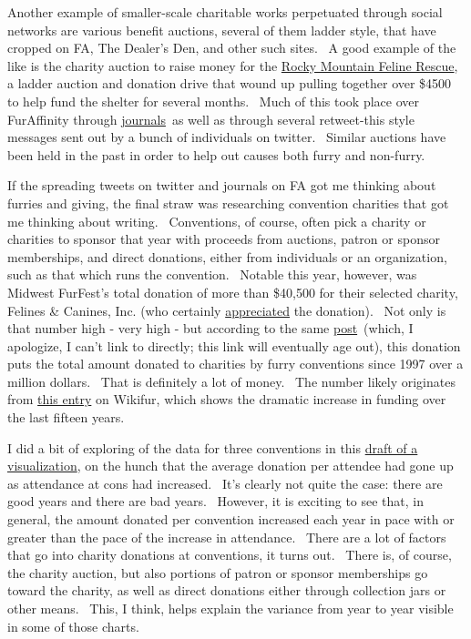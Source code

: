 Another example of smaller-scale charitable works perpetuated through
social networks are various benefit auctions, several of them ladder
style, that have cropped on FA, The Dealer's Den, and other such sites.
~A good example of the like is the charity auction to raise money for
the \href{http://www.rmfr-colorado.org/}{Rocky Mountain Feline Rescue},
a ladder auction and donation drive that wound up pulling together over
\$4500 to help fund the shelter for several months. ~Much of this took
place over FurAffinity through
\href{http://www.furaffinity.net/journal/3874623/}{journals}~as well as
through several retweet-this style messages sent out by a bunch of
individuals on twitter. ~Similar auctions have been held in the past in
order to help out causes both furry and non-furry.

If the spreading tweets on twitter and journals on FA got me thinking
about furries and giving, the final straw was researching convention
charities that got me thinking about writing. ~Conventions, of course,
often pick a charity or charities to sponsor that year with proceeds
from auctions, patron or sponsor memberships, and direct donations,
either from individuals or an organization, such as that which runs the
convention. ~Notable this year, however, was Midwest FurFest's total
donation of more than \$40,500 for their selected charity, Felines \&
Canines, Inc. (who certainly
\href{https://twitter.com/midwestfurfest/status/281458767600693248}{appreciated}
the donation). ~Not only is that number high - very high - but according
to the same \href{http://www.furfest.org}{post}~(which, I apologize, I
can't link to directly; this link will eventually age out), this
donation puts the total amount donated to charities by furry conventions
since 1997 over a million dollars. ~That is definitely a lot of money.
~The number likely originates from
\href{http://en.wikifur.com/wiki/Charity}{this entry} on Wikifur, which
shows the dramatic increase in funding over the last fifteen years.

I did a bit of exploring of the data for three conventions in this
\href{http://vis.adjectivespecies.com/giving/}{draft of a
visualization}, on the hunch that the average donation per attendee had
gone up as attendance at cons had increased. ~It's clearly not quite the
case: there are good years and there are bad years. ~However, it is
exciting to see that, in general, the amount donated per convention
increased each year in pace with or greater than the pace of the
increase in attendance. ~There are a lot of factors that go into charity
donations at conventions, it turns out. ~There is, of course, the
charity auction, but also portions of patron or sponsor memberships go
toward the charity, as well as direct donations either through
collection jars or other means. ~This, I think, helps explain the
variance from year to year visible in some of those charts.

